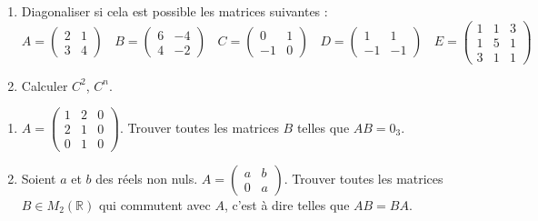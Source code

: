 \documentclass[12pt,a4paper]{report}
\newcounter{exo}[section]
\begin{document}


\exo
\begin{enumerate}
        \item Diagonaliser si cela est possible les matrices suivantes  :\\
        $A=\begin{pmatrix}
		2&1\\3&4
        \end{pmatrix}~~~~
         B=\begin{pmatrix}
		6&-4\\4&-2
	 \end{pmatrix}~~~~
	 C= \begin{pmatrix}
		0&1\\-1&0	
	\end{pmatrix}~~~~
	D=\begin{pmatrix}
		1&1\\-1&-1
	\end{pmatrix}~~~~
	E=\begin{pmatrix}
		1&1&3\\
		1&5&1\\
		3&1&1
	\end{pmatrix}$
	\item Calculer $C^2$, $C^n$.
\end{enumerate}



\begin{center}
\end{center}
\indent\exo
\begin{enumerate}
	\item $A=\begin{pmatrix}
		1&2&0\\
		2&1&0\\
		0&1&0
	\end{pmatrix}$. Trouver toutes les matrices $B$ telles que $AB=0_3$.
	\item Soient $a$ et $b$ des réels non nuls. $A=\begin{pmatrix}
		a&b\\0&a
	\end{pmatrix}$. Trouver toutes les matrices $B \in M_2(\mathbb{R})$ qui commutent avec $A$, c'est à dire telles que $AB=BA$.

\end{enumerate}
\end{document}
